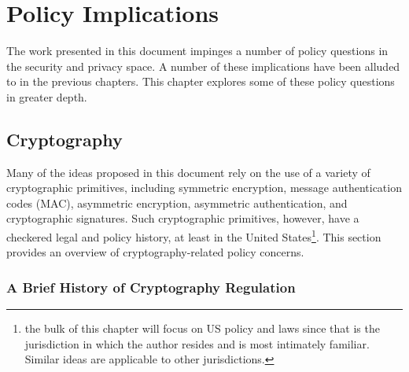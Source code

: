 \chapter{Policy Implications}
\label{chap:policy}

The work presented in this document impinges a number of policy
questions in the security and privacy space. A number of these
implications have been alluded to in the previous chapters. This
chapter explores some of these policy questions in greater depth.

\section{Cryptography}
\label{chap:policy:crypto}

Many of the ideas proposed in this document rely on the use of a
variety of cryptographic primitives, including symmetric encryption,
message authentication codes (MAC), asymmetric encryption, asymmetric
authentication, and cryptographic signatures. Such cryptographic
primitives, however, have a checkered legal and policy history, at
least in the United States\footnote{the bulk of this chapter will
  focus on US policy and laws since that is the jurisdiction in which
  the author resides and is most intimately familiar. Similar ideas
  are applicable to other jurisdictions.}. This section provides an
overview of cryptography-related policy concerns.

\subsection{A Brief History of Cryptography Regulation}

